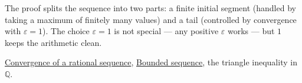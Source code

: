 \begin{remark*}
The proof splits the sequence into two parts: a finite initial segment
(handled by taking a maximum of finitely many values) and a tail
(controlled by convergence with $\varepsilon = 1$).  The choice
$\varepsilon = 1$ is not special --- any positive $\varepsilon$ works --- but
$1$ keeps the arithmetic clean.
\end{remark*}

\begin{dependencies}
\hyperref[def:convergent-rational-sequence]{Convergence of a rational sequence},
\hyperref[def:bounded-sequence-q]{Bounded sequence},
the triangle inequality in $\mathbb{Q}$.
\end{dependencies}

\clearpage
